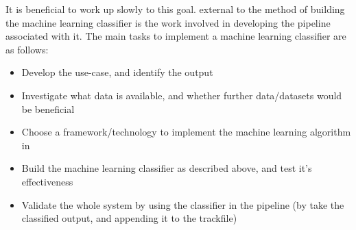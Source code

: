 \documentclass{UoNMCHA}
\numberwithin{equation}{section}
\begin{document}
It is beneficial to work up slowly to this goal. external to the method of building the machine learning classifier is the work involved in developing the pipeline associated with it. The main tasks to implement a machine learning classifier are as follows:

\begin{itemize}
    \item Develop the use-case, and identify the output
    \item Investigate what data is available, and whether further data/datasets would be beneficial
    \item Choose a framework/technology to implement the machine learning algorithm in
    \item Build the machine learning classifier as described above, and test it's effectiveness
    \item Validate the whole system by using the classifier in the pipeline (by take the classified output, and appending it to the trackfile)
\end{itemize}


\end{document}
